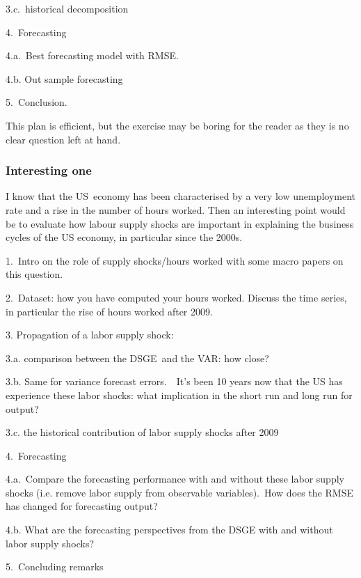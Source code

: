 \documentclass[a4paper,12pt]{article}%
\begin{document}
3.c.\ historical decomposition

4.\ Forecasting

4.a.\ Best forecasting model with RMSE.

4.b. Out sample forecasting

5.\ Conclusion.

This plan is efficient, but the exercise may be boring for the reader as they
is no clear question left at hand.

\subsubsection{Interesting one}

I know that the US\ economy has been characterised by a very low unemployment
rate and a rise in the number of hours worked. Then an interesting point would
be to evaluate how labour supply shocks are important in explaining the
business cycles of the US economy, in particular since the 2000s.

1.\ Intro on the role of supply shocks/hours worked with some macro papers on
this question.

2.\ Dataset: how you have computed your hours worked. Discuss the time series,
in particular the rise of hours worked after 2009.

3. Propagation of a labor supply shock:

3.a. comparison between the DSGE\ and the VAR: how close?

3.b. Same for variance forecast errors.\ \ It's been 10 years now that the US
has experience these labor shocks: what implication in the short run and long
run for output? 

3.c. the historical contribution of labor supply shocks after 2009

4.\ Forecasting

4.a.\ Compare the forecasting performance with and without these labor supply
shocks (i.e. remove labor supply from observable variables).\ How does the
RMSE has changed for forecasting output?

4.b. What are the forecasting perspectives from the DSGE with and without
labor supply shocks?

5.\ Concluding remarks
\end{document}
